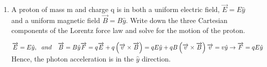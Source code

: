 \documentclass[fleqn]{article}
\begin{document}
\begin{enumerate}
\begin{enumerate}
    \end{enumerate}

    \item  A proton of mass m and charge q is in both a uniform electric field,
    $\overrightarrow{E}=E\hat{y}$ and a uniform magnetic field $\overrightarrow{B}=B\hat{y}$. Write down the three
    Cartesian components of the Lorentz force law and solve for the motion of the proton.

      \textcolor{hwColor}{
        $
          \overrightarrow{E}=E\hat{y}, ~~ and ~~~ \overrightarrow{B}=B\hat{y} \\
          \\
          \\
          \overrightarrow{F}=q\overrightarrow{E}+q\left(\overrightarrow{v} \times \overrightarrow{B}\right)=qE \hat{y}+qB\left(\overrightarrow{v} \times \overrightarrow{B}\right)\\
          \\
          \overrightarrow{v}=v \hat{y} \rightarrow \overrightarrow{F}=qE \hat{y} \\
          \\
        $
        Hence, the photon acceleration is in the $\hat{y}$ direction.
      }

  \end{enumerate}
\end{document}
